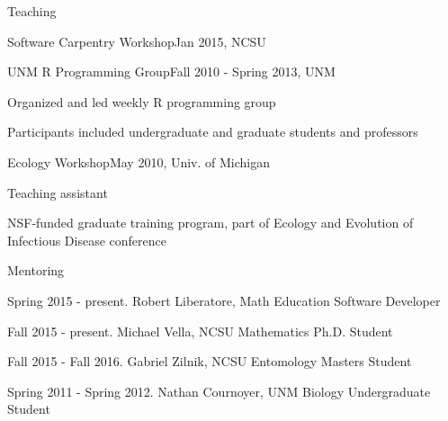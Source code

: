 \documentclass{resume} %
\begin{document}
\begin{rSection}{Teaching}
\begin{rSubsection}{Software Carpentry Workshop}{Jan 2015, NCSU}{}{}
\end{rSubsection}
\begin{rSubsection}{UNM R Programming Group}{Fall 2010 - Spring 2013, UNM}{}{}
\item Organized and led weekly R programming group
\item Participants included undergraduate and graduate students and professors
\end{rSubsection}
\begin{rSubsection}{Ecology Workshop}{May 2010, Univ. of Michigan}{}{}
\item Teaching assistant
\item NSF-funded graduate training program, part of Ecology and Evolution of Infectious
Disease conference
\end{rSubsection}
\end{rSection}

\begin{rSection}{Mentoring}
\item Spring 2015 - present. Robert Liberatore, Math Education Software Developer
\item Fall 2015 - present. Michael Vella, NCSU Mathematics Ph.D. Student
\item Fall 2015 - Fall 2016. Gabriel Zilnik, NCSU Entomology Masters Student
\item Spring 2011 - Spring 2012. Nathan Cournoyer, UNM Biology Undergraduate Student
\end{rSection}

\end{document}

